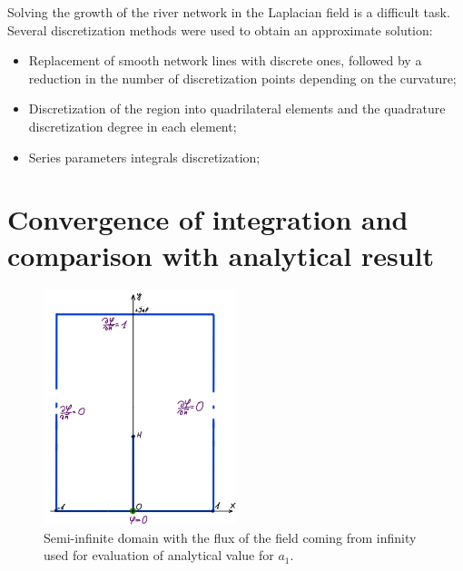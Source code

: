 \documentclass[]{pracamgr}
\begin{document}
    Solving the growth of the river network in the Laplacian field is a difficult task. Several discretization methods were used to obtain an approximate solution: 
    
    \vspace{-\topsep}
    \begin{itemize}
      \item Replacement of smooth network lines with discrete ones, followed by a reduction in the number of discretization points depending on the curvature;
      \item Discretization of the region into quadrilateral elements and the quadrature discretization degree in each element;
      \item Series parameters integrals discretization;
    \end{itemize}

    
    \section{Convergence of integration and comparison with analytical result}

      \begin{figure}[H]
        \centering
        \includegraphics[width=0.5\textwidth]{figs/test_function_boundary.jpg}
        \caption{Semi-infinite domain with the flux of the field coming from infinity used for evaluation of analytical value for $a_1$.}
        \label{test_boundary}
      \end{figure}
\end{document}
